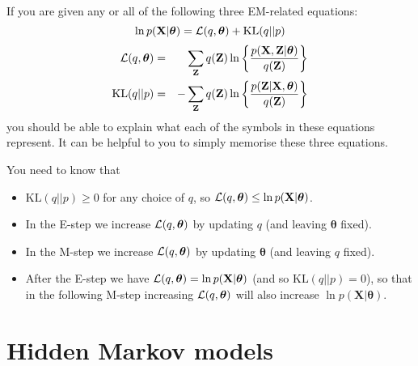 \documentclass{article}
\newcommand{\Xvec}{\ensuremath{\mathbf{X}}}
\newcommand{\Zvec}{\ensuremath{\mathbf{Z}}}
\newcommand{\thetavec}{\ensuremath{{\bm \theta}}}
\newcommand{\yntk}{You need to know}
\begin{document}
If you are given any or all of the following three EM-related equations:
  \[
    \ln p(\Xvec | \thetavec)  = {\cal L}(q, \thetavec) + \mathrm{KL}(q
      || p)
  \]
  \begin{eqnarray*}
    {\cal L}(q, \thetavec) & = & \sum_{\Zvec} q(\Zvec) \ln \left\{
      \frac{p(\Xvec,\Zvec| \thetavec)}{q(\Zvec)} \right\} \\
    \mathrm{KL}(q || p) & = & -\sum_{\Zvec} q(\Zvec) \ln \left\{
      \frac{p(\Zvec|\Xvec, \thetavec)}{q(\Zvec)} \right\}
  \end{eqnarray*}
you should be able to explain what each of the symbols in these
equations represent. It can be helpful to you to simply memorise these
three equations.

\yntk{} that
 \begin{itemize}
  \item $\mathrm{KL}(q
      || p) \geq 0$ for any choice of $q$, so ${\cal L}(q, \thetavec)
      \leq \ln p(\Xvec | \thetavec)$.
    \item In the E-step we increase ${\cal L}(q, \thetavec)$ by
      updating $q$ (and leaving $\thetavec$ fixed).
    \item In the M-step we increase ${\cal L}(q, \thetavec)$ by
      updating $\thetavec$ (and leaving $q$ fixed).
    \item After the E-step we have
      ${\cal L}(q, \thetavec) = \ln p(\Xvec | \thetavec)$ (and so $\mathrm{KL}(q
      || p) = 0$), so that in
      the following M-step increasing ${\cal L}(q, \thetavec)$ will
      also increase $\ln p(\Xvec | \thetavec)$.
  \end{itemize}
 
\section{Hidden Markov models}
\label{sec:hmms}
\end{document}
